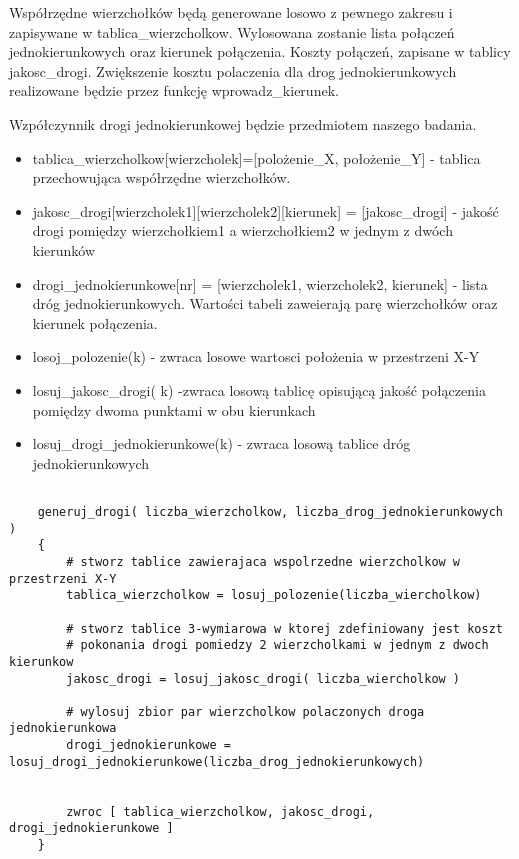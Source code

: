 \documentclass{article}
\begin{document}
Współrzędne wierzchołków będą generowane losowo z pewnego zakresu i zapisywane w tablica\_wierzcholkow. Wylosowana zostanie lista połączeń jednokierunkowych oraz kierunek połączenia. Koszty połączeń, zapisane w tablicy jakosc\_drogi. Zwiększenie kosztu polaczenia dla drog jednokierunkowych realizowane będzie przez funkcję wprowadz\_kierunek.

Wzpółczynnik drogi jednokierunkowej będzie przedmiotem naszego badania. \\

\begin{itemize}
\item tablica\_wierzcholkow[wierzcholek]=[polożenie\_X, położenie\_Y] - tablica przechowująca współrzędne wierzchołków.
\item jakosc\_drogi[wierzcholek1][wierzcholek2][kierunek] = [jakosc\_drogi] - jakość drogi pomiędzy wierzchołkiem1 a wierzchołkiem2 w jednym z dwóch kierunków
\item drogi\_jednokierunkowe[nr] = [wierzcholek1, wierzcholek2, kierunek] - lista dróg jednokierunkowych. Wartości tabeli zaweierają parę wierzchołków oraz kierunek połączenia.
\item losoj\_polozenie(k) -  zwraca losowe wartosci położenia w przestrzeni X-Y
\item losuj\_jakosc\_drogi( k) -zwraca losową tablicę opisującą jakość połączenia pomiędzy dwoma punktami w obu kierunkach
\item losuj\_drogi\_jednokierunkowe(k) - zwraca losową tablice dróg jednokierunkowych
\end{itemize}

\begin{lstlisting}[caption={Funkcja generujaca dane wejsiowe}]

	generuj_drogi( liczba_wierzcholkow, liczba_drog_jednokierunkowych 	)
	{	
		# stworz tablice zawierajaca wspolrzedne wierzcholkow w przestrzeni X-Y
		tablica_wierzcholkow = losuj_polozenie(liczba_wiercholkow)

		# stworz tablice 3-wymiarowa w ktorej zdefiniowany jest koszt 
		# pokonania drogi pomiedzy 2 wierzcholkami w jednym z dwoch kierunkow
		jakosc_drogi = losuj_jakosc_drogi( liczba_wiercholkow )
		
		# wylosuj zbior par wierzcholkow polaczonych droga jednokierunkowa
		drogi_jednokierunkowe = losuj_drogi_jednokierunkowe(liczba_drog_jednokierunkowych)

		
		zwroc [ tablica_wierzcholkow, jakosc_drogi, drogi_jednokierunkowe ]
	}
		

\end{lstlisting}
\end{document}
